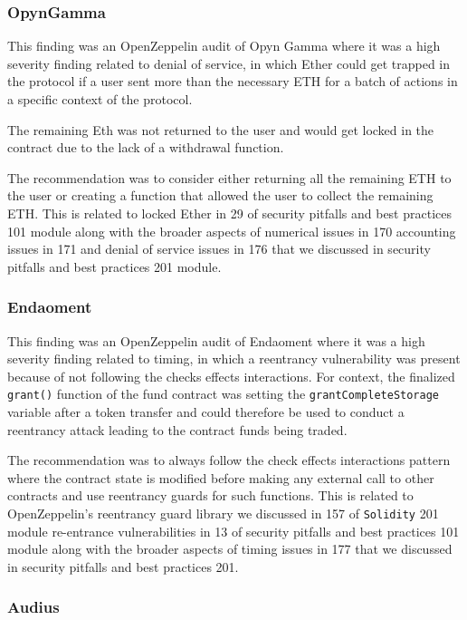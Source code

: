 \subsubsection{OpynGamma}\label{opyngamma}

This finding was an OpenZeppelin audit of Opyn Gamma where it was a high
severity finding related to denial of service, in which Ether could get
trapped in the protocol if a user sent more than the necessary ETH for a
batch of actions in a specific context of the protocol.

The remaining Eth was not returned to the user and would get locked in
the contract due to the lack of a withdrawal function.

The recommendation was to consider either returning all the remaining
ETH to the user or creating a function that allowed the user to collect
the remaining ETH. This is related to locked Ether in 29 of security
pitfalls and best practices 101 module along with the broader aspects of
numerical issues in 170 accounting issues in 171 and denial of service
issues in 176 that we discussed in security pitfalls and best practices
201 module.

\subsubsection{Endaoment}\label{endaoment}

This finding was an OpenZeppelin audit of Endaoment where it was a high
severity finding related to timing, in which a reentrancy vulnerability
was present because of not following the checks effects interactions.
For context, the finalized \texttt{grant()} function of the fund
contract was setting the \texttt{grantCompleteStorage} variable after a
token transfer and could therefore be used to conduct a reentrancy
attack leading to the contract funds being traded.

The recommendation was to always follow the check effects interactions
pattern where the contract state is modified before making any external
call to other contracts and use reentrancy guards for such functions.
This is related to OpenZeppelin's reentrancy guard library we discussed
in 157 of \texttt{Solidity} 201 module re-entrance vulnerabilities in 13
of security pitfalls and best practices 101 module along with the
broader aspects of timing issues in 177 that we discussed in security
pitfalls and best practices 201.

\subsubsection{Audius}\label{audius}

